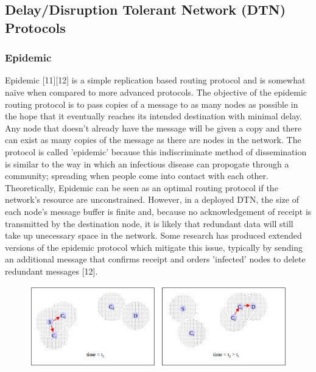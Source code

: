 \documentclass{article}
\begin{document}
\subsection{Delay/Disruption Tolerant Network (DTN) Protocols}
\subsubsection{Epidemic}
Epidemic [11][12] is a simple replication based routing protocol and is somewhat naïve when compared to more advanced protocols. The objective of the epidemic routing protocol is to pass copies of a message to as many nodes as possible in the hope that it eventually reaches its intended destination with minimal delay. Any node that doesn't already have the message will be given a copy and there can exist as many copies of the message as there are nodes in the network. The protocol is called 'epidemic' because this indiscriminate method of dissemination is similar to the way in which an infectious disease can propogate through a community; spreading when people come into contact with each other.\\
\newline Theoretically, Epidemic can be seen as an optimal routing protocol if the network's resource are unconstrained. However, in a deployed DTN, the size of each node's message buffer is finite and, because no acknowledgement of receipt is transmitted by the destination node, it is likely that redundant data will still take up unecessary space in the network. Some research has produced extended versions of the epidemic protocol which mitigate this issue, typically by sending an additional message that confirms receipt and orders 'infected' nodes to delete redundant messages [12].


\begin{figure}[h!]
\captionsetup{justification=centering, font=footnotesize}
\centering
  \includegraphics[width=.98\linewidth]{Screenshots/Epidemic.png}
  \label{fig:test1}
\end{figure}
\end{document}
